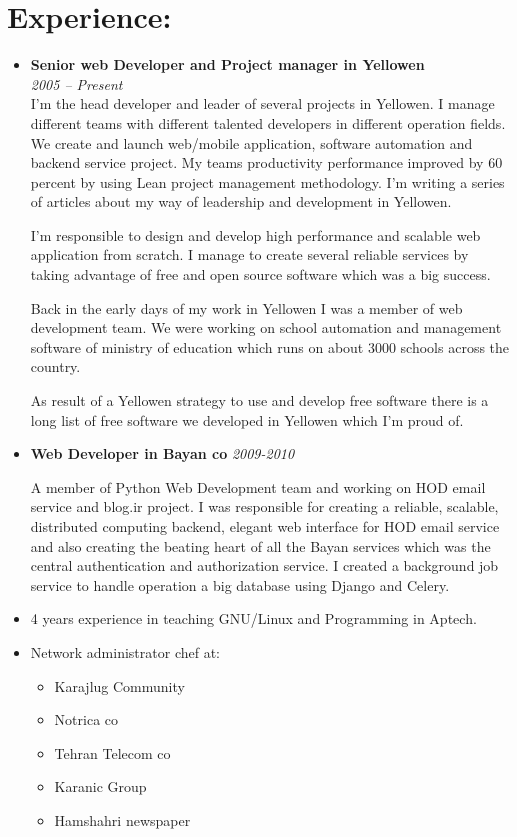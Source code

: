 \documentclass[a4paper,11pt]{article}
\begin{document}
\section*{Experience:}
\begin{itemize}
\item \textbf{Senior web Developer and Project manager in Yellowen}\\
  \emph{2005 – Present}\\
  I'm the head developer and leader of several projects in Yellowen.
  I manage different teams with different talented developers in different
  operation fields. We create and launch web/mobile application, software automation and
  backend service project. My teams productivity performance improved by 60 percent
  by using Lean project management methodology. I'm writing a series of articles about
  my way of leadership and development in Yellowen.

  I'm responsible to design and develop high performance and scalable web application
  from scratch. I manage to create several reliable services by taking advantage of
  free and open source software which was a big success.

  Back in the early days of my work in Yellowen I was a member of web development team.
  We were working on school automation and management software of ministry of education
  which runs on about 3000 schools across the country.

  As result of a Yellowen strategy to use and develop free software there is a long list
  of free software we developed in Yellowen which I'm proud of.

\item \textbf{Web Developer in Bayan co}
  \emph{2009-2010}

A member of Python Web Development team and working on HOD email service and blog.ir project.
I was responsible for creating a reliable, scalable, distributed computing backend, elegant web
interface for HOD email service and also creating the beating heart of all the Bayan services
which was the central authentication and authorization service. I created a background job
 service to handle operation a big database using Django and Celery.

\item 4 years experience in teaching GNU/Linux and Programming in Aptech.
\item Network administrator chef at:
  \begin{itemize}
  \item Karajlug Community
  \item Notrica co
  \item Tehran Telecom co
  \item Karanic Group
  \item Hamshahri newspaper
  \end{itemize}
\end{itemize}
\end{document}
